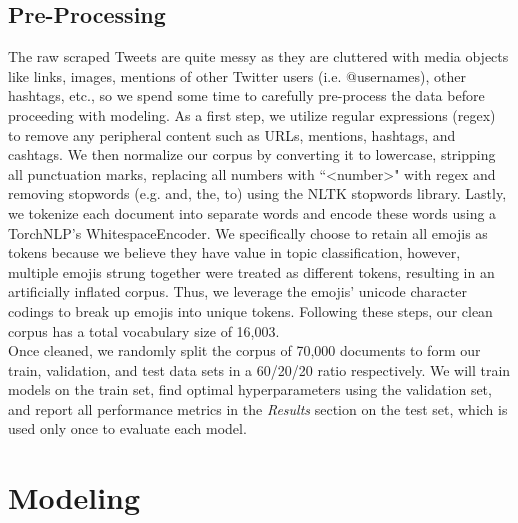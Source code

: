 \documentclass[11pt]{article}
\begin{document}
\subsection{Pre-Processing}

The raw scraped Tweets are quite messy as they are cluttered with media objects like links, images, mentions of other Twitter users (i.e. @usernames), other hashtags, etc., so we spend some time to carefully pre-process the data before proceeding with modeling. As a first step, we utilize regular expressions (regex) to remove any peripheral content such as URLs, mentions, hashtags, and cashtags. We then normalize our corpus by converting it to lowercase, stripping all punctuation marks, replacing all numbers with ``\textless number\textgreater" with regex and removing stopwords (e.g. and, the, to) using the NLTK stopwords library. Lastly, we tokenize each document into separate words and encode these words using a TorchNLP's WhitespaceEncoder. We specifically choose to retain all emojis as tokens because we believe they have value in topic classification, however, multiple emojis strung together were treated as different tokens, resulting in an artificially inflated corpus. Thus, we leverage the emojis' unicode character codings to break up emojis into unique tokens. Following these steps, our clean corpus has a total vocabulary size of 16,003.
\\[5pt]
\noindent Once cleaned, we randomly split the corpus of 70,000 documents to form our train, validation, and test data sets in a 60/20/20 ratio respectively. We will train models on the train set, find optimal hyperparameters using the validation set, and report all performance metrics in the \emph{Results} section on the test set, which is used only once to evaluate each model.




\section{Modeling}
\end{document}
